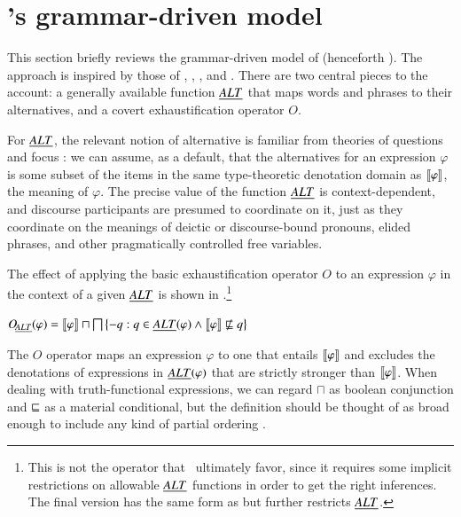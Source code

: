 \documentclass[leqno,12pt]{article}
\begin{document}

\section{\CFS's grammar-driven model}\label{sec:cfs}

This section briefly reviews the grammar-driven model of
\citet{ChierchiaFoxSpector08} (henceforth \CFS).  The approach is
inspired by those of \citet{Chierchia01}, \citet{Sauerland01},
\citet{Spector:2007}, and \citet{Fox:2007,Fox:2009}. There are two
central pieces to the account: a generally available function $\emph{ALT}$
that maps words and phrases to their alternatives, and a covert
exhaustification operator $O$.

For $\emph{ALT}$, the relevant notion of alternative is familiar from
theories of questions and focus \citep{Groenendijk84,Rooth85,Rooth92}:
we can assume, as a default, that the alternatives for an expression
$\varphi$ is some subset of the items in the same type-theoretic
denotation domain as $\llbracket\varphi\rrbracket$, the meaning of $\varphi$.  The
precise value of the function $\emph{ALT}$ is context-dependent, and
discourse participants are presumed to coordinate on it, just as they
coordinate on the meanings of deictic or discourse-bound pronouns,
elided phrases, and other pragmatically controlled free variables.

The effect of applying the basic exhaustification operator $O$ to an
expression $\varphi$ in the context of a given $\emph{ALT}$ is shown in
\citep{Spector:2007,Fox:2007,Fox:2009,Magri:2009,ChierchiaFoxSpector08}.\footnote{This
  is not the operator that \CFS\ ultimately favor, since it
  requires some implicit restrictions on allowable $\emph{ALT}$ functions in
  order to get the right inferences.  The final version has the same
  form as  but further restricts $\emph{ALT}$.}
%
\begin{examples}
\item\label{def:O}
  $\OALT(\varphi) = 
  \sem{\varphi} \sqcap \bigsqcap\set{ -q : q \in \ALT(\varphi) \wedge \sem{\varphi} \not\entails q}$ 
\end{examples}
%
The $O$ operator maps an expression $\varphi$ to one that entails
$\llbracket\varphi\rrbracket$ and excludes the denotations of expressions in
$\emph{ALT}(\varphi)$ that are strictly stronger than $\llbracket\varphi\rrbracket$. When
dealing with truth-functional expressions, we can regard $\sqcap$ as
boolean conjunction and $\sqsubseteq$ as a material conditional, but the
definition should be thought of as broad enough to include any kind of
partial ordering .
\end{document}
